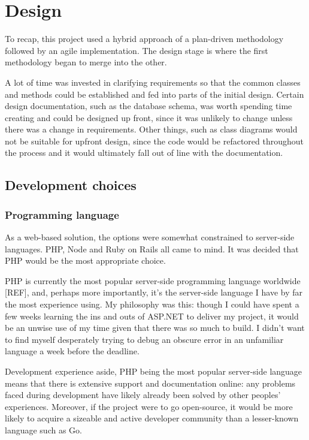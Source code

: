 \chapter{Design} %

To recap, this project used a hybrid approach of a plan-driven methodology followed by an agile implementation. The design stage is where the first methodology began to merge into the other.

A lot of time was invested in clarifying requirements so that the common classes and methods could be established and fed into parts of the initial design. Certain design documentation, such as the database schema, was worth spending time creating and could be designed up front, since it was unlikely to change unless there was a change in requirements. Other things, such as class diagrams would not be suitable for upfront design, since the code would be refactored throughout the process and it would ultimately fall out of line with the documentation.

\section{Development choices}

\subsection{Programming language}

As a web-based solution, the options were somewhat constrained to server-side languages. PHP, Node and Ruby on Rails all came to mind. It was decided that PHP would be the most appropriate choice.

PHP is currently the most popular server-side programming language worldwide [REF], and, perhaps more importantly, it's the server-side language I have by far the most experience using. My philosophy was this: though I could have spent a few weeks learning the ins and outs of ASP.NET to deliver my project, it would be an unwise use of my time given that there was so much to build. I didn't want to find myself desperately trying to debug an obscure error in an unfamiliar language a week before the deadline. %

Development experience aside, PHP being the most popular server-side language means that there is extensive support and documentation online: any problems faced during development have likely already been solved by other peoples' experiences. Moreover, if the project were to go open-source, it would be more likely to acquire a sizeable and active developer community than a lesser-known language such as Go.

